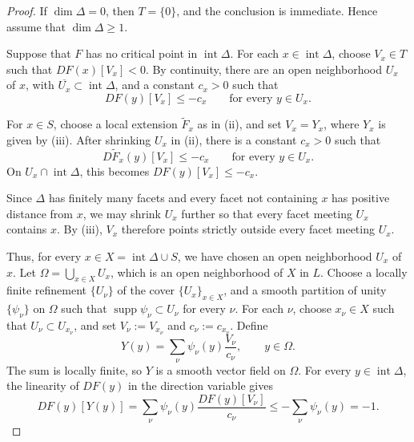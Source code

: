 \documentclass[12pt,reqno]{amsart}
\numberwithin{equation}{section}
\theoremstyle{remark}
\begin{document}
\begin{proof}
	If \(\dim\Delta=0\), then \(T=\{0\}\), and the conclusion is
	immediate. Hence assume that \(\dim\Delta\geq1\).

	
	Suppose that \(F\) has no critical point in
	\(\operatorname{int}\Delta\). For each
	\(x\in\operatorname{int}\Delta\), choose \(V_x\in T\) such that
	\(DF(x)[V_x]<0\). By continuity, there are an open neighborhood
	\(U_x\) of \(x\), with
	\(\overline{U_x}\subset\operatorname{int}\Delta\), and a constant
	\(c_x>0\) such that
	\[
	DF(y)[V_x]\leq-c_x
	\qquad
	\text{for every }y\in U_x.
	\]
	
	For \(x\in S\), choose a local extension
	\(\widetilde F_x\) as in \textup{(ii)}, and set
	\(V_x=Y_x\), where \(Y_x\) is given by \textup{(iii)}. After shrinking \(U_x\) in \textup{(ii)},
	there is a constant \(c_x>0\) such that
	\[
	D\widetilde F_x(y)[V_x]\leq-c_x
	\qquad
	\text{for every }y\in U_x.
	\]
	On \(U_x\cap\operatorname{int}\Delta\), this becomes
	\(DF(y)[V_x]\leq-c_x\).
	
	Since \(\Delta\) has finitely many facets and every facet not
	containing \(x\) has positive distance from \(x\), we may shrink
	\(U_x\) further so that every facet meeting \(U_x\) contains
	\(x\). By \textup{(iii)}, \(V_x\) therefore points strictly outside every
	facet meeting \(U_x\).
	
Thus, for every \(x\in X=\operatorname{int}\Delta\cup S\), we have
chosen an open neighborhood \(U_x\) of \(x\). Let
	\(\Omega=\bigcup_{x\in X}U_x\), which is an open neighborhood of
	\(X\) in \(L\). Choose a locally finite refinement
	\(\{U_\nu\}\) of the cover \(\{U_x\}_{x\in X}\), and a smooth
	partition of unity \(\{\psi_\nu\}\) on \(\Omega\) such that
	\(\operatorname{supp}\psi_\nu\subset U_\nu\) for every \(\nu\). For each \(\nu\), choose \(x_\nu\in X\) such that
	\(U_\nu\subset U_{x_\nu}\), and set
	\(V_\nu:=V_{x_\nu}\) and \(c_\nu:=c_{x_\nu}\).
	Define
	\[
	Y(y)=\sum_\nu\psi_\nu(y)\frac{V_\nu}{c_\nu},
	\qquad y\in\Omega.
	\]
	The sum is locally finite, so \(Y\) is a smooth vector field on
	\(\Omega\). For every \(y\in\operatorname{int}\Delta\), the linearity
	of \(DF(y)\) in the direction variable gives
	\begin{equation}\label{eq:unit-descent}
		DF(y)[Y(y)]
		=
		\sum_\nu\psi_\nu(y)\frac{DF(y)[V_\nu]}{c_\nu}
		\leq
		-\sum_\nu\psi_\nu(y)
		=-1.
	\end{equation}


\end{proof}
\end{document}
